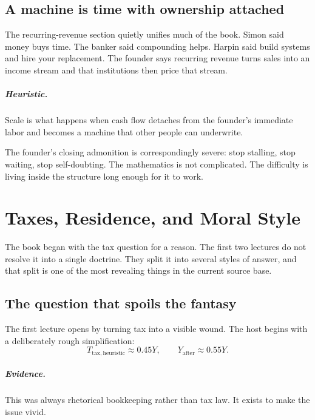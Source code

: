 \documentclass[11pt,oneside]{book}
\begin{document}
\section{A machine is time with ownership attached}

The recurring-revenue section quietly unifies much of the book. Simon said money buys time. The banker said compounding helps. Harpin said build systems and hire your replacement. The founder says recurring revenue turns sales into an income stream and that institutions then price that stream.

\paragraph{Heuristic.} Scale is what happens when cash flow detaches from the founder's immediate labor and becomes a machine that other people can underwrite.

The founder's closing admonition is correspondingly severe: stop stalling, stop waiting, stop self-doubting. The mathematics is not complicated. The difficulty is living inside the structure long enough for it to work.

\chapter{Taxes, Residence, and Moral Style}

The book began with the tax question for a reason. The first two lectures do not resolve it into a single doctrine. They split it into several styles of answer, and that split is one of the most revealing things in the current source base.

\section{The question that spoils the fantasy}

The first lecture opens by turning tax into a visible wound. The host begins with a deliberately rough simplification:
\begin{equation}
T_{\mathrm{tax,heuristic}} \approx 0.45Y,
\qquad
Y_{\mathrm{after}} \approx 0.55Y.
\end{equation}

\paragraph{Evidence.} This was always rhetorical bookkeeping rather than tax law. It exists to make the issue vivid.
\end{document}
